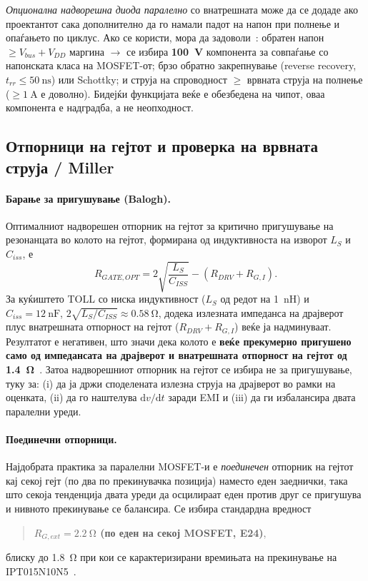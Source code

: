 \documentclass[journal,onecolumn,11pt]{IEEEtran}
\begin{document}
\emph{Опционална надворешна диода паралелно} со внатрешната може да се додаде ако
проектантот сака дополнително да го намали падот на напон при полнење и опаѓањето по
циклус. Ако се користи, мора да задоволи~\cite{infineon_monolithic,infineon_bootoverview}:
обратен напон $\ge V_{bus}+V_{DD}$ маргина $\rightarrow$ се избира \textbf{\SI{100}{\volt}}
компонента за совпаѓање со напонската класа на MOSFET-от; брзо обратно закрепнување
(reverse recovery, $t_{rr}\le\SI{50}{\nano\second}$) или Schottky; и струја на
спроводност $\ge$ врвната струја на полнење ($\ge\SI{1}{\ampere}$ е доволно). Бидејќи
функцијата веќе е обезбедена на чипот, оваа компонента е надградба, а не неопходност.

\subsection{Отпорници на гејтот и проверка на врвната струја / Miller}\label{sec:gateR}
\paragraph{Барање за пригушување (Balogh).} Оптималниот надворешен отпорник на гејтот
за критично пригушување на резонанцата во колото на гејтот, формирана од
индуктивноста на изворот $L_S$ и $C_{iss}$, е~\cite{balogh}
\begin{equation}
R_{GATE,OPT}=2\sqrt{\frac{L_S}{C_{ISS}}}-(R_{DRV}+R_{G,I}).
\end{equation}
За куќиштето TOLL со ниска индуктивност ($L_S$ од редот на \SI{1}{\nano\henry}) и
$C_{iss}=\SI{12}{\nano\farad}$, $2\sqrt{L_S/C_{ISS}}\approx\SI{0.58}{\ohm}$, додека
излезната импеданса на драјверот плус внатрешната отпорност на гејтот
($R_{DRV}+R_{G,I}$) веќе ја надминуваат. Резултатот е негативен, што значи дека
колото е \textbf{веќе прекумерно пригушено само од импедансата на драјверот и
внатрешната отпорност на гејтот од \SI{1.4}{\ohm}}~\cite{balogh,ipt015ds}. Затоа
надворешниот отпорник на гејтот се избира не за пригушување, туку за: (i) да ја држи
споделената излезна струја на драјверот во рамки на оценката, (ii) да го наштелува
$\mathrm{d}v/\mathrm{d}t$ заради EMI и (iii) да ги избалансира двата паралелни уреди.

\paragraph{Поединечни отпорници.} Најдобрата практика за паралелни MOSFET-и е
\emph{поединечен} отпорник на гејтот кај секој гејт (по два по прекинувачка позиција)
наместо еден заеднички, така што секоја тенденција двата уреди да осцилираат еден
против друг се пригушува и нивното прекинување се балансира. Се избира стандардна
вредност
\begin{quote}
\textbf{$R_{G,ext}=\SI{2.2}{\ohm}$ (по еден на секој MOSFET, E24)},
\end{quote}
блиску до \SI{1.8}{\ohm} при кои се карактеризирани времињата на прекинување на
IPT015N10N5~\cite{ipt015ds}.
\end{document}
